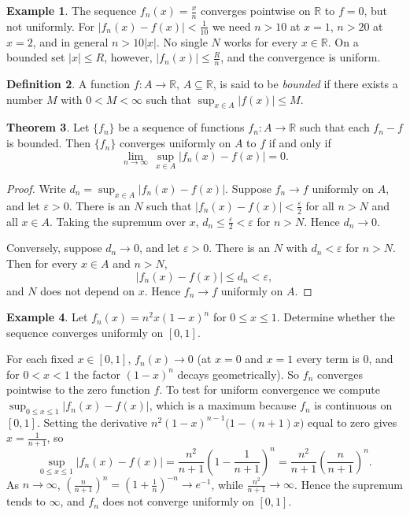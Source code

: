 \documentclass[11pt,a4paper]{article}
\numberwithin{equation}{section}
\theoremstyle{definition}
\newtheorem{thm}{Theorem}[subsection]
\newtheorem{defn}[thm]{Definition}
\newtheorem{exa}[thm]{Example}
\begin{document}
\begin{exa}
The sequence $f_n(x) = \frac{x}{n}$ converges pointwise on $\mathbb{R}$ to $f = 0$, but not uniformly. For $|f_n(x) - f(x)| < \frac{1}{10}$ we need $n>10$ at $x=1$, $n>20$ at $x=2$, and in general $n>10|x|$. No single $N$ works for every $x\in\mathbb{R}$. On a bounded set $|x|\leq R$, however, $|f_n(x)|\leq \frac{R}{n}$, and the convergence is uniform.
\end{exa}


\begin{defn}
A function $f: A\longrightarrow \mathbb{R}$, $A\subseteq\mathbb{R}$, is said to be \emph{bounded} if there exists a number $M$ with $0 < M < \infty$ such that $\sup_{x\in A}|f(x)|\leq M$.
\end{defn}


\begin{thm}
Let $\{f_n\}$ be a sequence of functions $f_n: A\longrightarrow \mathbb{R}$ such that each $f_n - f$ is bounded. Then $\{f_n\}$ converges uniformly on $A$ to $f$ if and only if
$$\lim_{n\rightarrow \infty} \, \sup_{x\in A}|f_n(x) - f(x)| = 0 .$$
\end{thm}

\begin{proof}
Write $d_n = \sup_{x\in A}|f_n(x) - f(x)|$. Suppose $f_n\longrightarrow f$ uniformly on $A$, and let $\varepsilon>0$. There is an $N$ such that $|f_n(x) - f(x)| < \frac{\varepsilon}{2}$ for all $n> N$ and all $x\in A$. Taking the supremum over $x$, $d_n\leq \frac{\varepsilon}{2}<\varepsilon$ for $n> N$. Hence $d_n\longrightarrow 0$.

Conversely, suppose $d_n\longrightarrow 0$, and let $\varepsilon>0$. There is an $N$ with $d_n<\varepsilon$ for $n>N$. Then for every $x\in A$ and $n>N$,
$$|f_n(x) - f(x)|  \leq d_n < \varepsilon ,$$
and $N$ does not depend on $x$. Hence $f_n\longrightarrow f$ uniformly on $A$.
\end{proof}


\begin{exa}
Let $f_n(x) = n^2 x (1 - x)^n$ for $0\leq x\leq 1$. Determine whether the sequence converges uniformly on $[0,1]$.

For each fixed $x\in[0,1]$, $f_n(x)\longrightarrow 0$ (at $x = 0$ and $x = 1$ every term is $0$, and for $0<x<1$ the factor $(1-x)^n$ decays geometrically). So $f_n$ converges pointwise to the zero function $f$. To test for uniform convergence we compute $\sup_{0\leq x\leq 1}|f_n(x) - f(x)|$, which is a maximum because $f_n$ is continuous on $[0,1]$. Setting the derivative $n^2(1-x)^{n-1}\bigl(1-(n+1)x\bigr)$ equal to zero gives $x = \frac{1}{n + 1}$, so
$$\sup_{0\leq x\leq 1}|f_n(x) - f(x)| = \frac{n^2}{n + 1}\left(1 - \frac{1}{n + 1}\right)^n = \frac{n^2}{n + 1}\left(\frac{n}{n+1}\right)^n .$$
As $n\longrightarrow\infty$, $\left(\frac{n}{n+1}\right)^n = \left(1+\frac{1}{n}\right)^{-n}\longrightarrow e^{-1}$, while $\frac{n^2}{n+1}\longrightarrow\infty$. Hence the supremum tends to $\infty$, and $f_n$ does not converge uniformly on $[0,1]$.
\end{exa}
\end{document}
